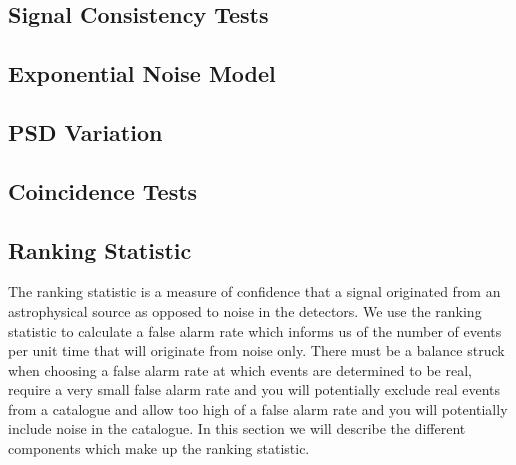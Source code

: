 \subsection{\label{2:sec:signal-consistency}Signal Consistency Tests}

\subsection{\label{2:sec:template-fits}Exponential Noise Model}

\subsection{\label{2:sec:psd-var}PSD Variation}

\subsection{\label{2:sec:coincidence-test}Coincidence Tests}

\subsection{\label{2:sec:ranking-statistic}Ranking Statistic}
The ranking statistic is a measure of confidence that a signal originated from an astrophysical source as opposed to noise in the detectors. We use the ranking statistic to calculate a false alarm rate which informs us of the number of events per unit time that will originate from noise only. There must be a balance struck when choosing a false alarm rate at which events are determined to be real, require a very small false alarm rate and you will potentially exclude real events from a catalogue and allow too high of a false alarm rate and you will potentially include noise in the catalogue. In this section we will describe the different components which make up the ranking statistic.


